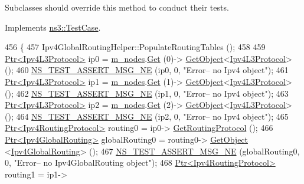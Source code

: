 Subclasses should override this method to conduct their tests. 

Implements \hyperlink{classns3_1_1TestCase_a8ff74680cf017ed42011e4be51917a24}{ns3\+::\+Test\+Case}.


\begin{DoxyCode}
456 \{
457   Ipv4GlobalRoutingHelper::PopulateRoutingTables ();
458 
459   \hyperlink{classns3_1_1Ptr}{Ptr<Ipv4L3Protocol>} ip0 = \hyperlink{classTwoLanTest_a6f71e9cc2b2a77a02f031abe9467b74c}{m\_nodes}.\hyperlink{classns3_1_1NodeContainer_a9ed96e2ecc22e0f5a3d4842eb9bf90bf}{Get} (0)->
      \hyperlink{classns3_1_1Object_a13e18c00017096c8381eb651d5bd0783}{GetObject}<\hyperlink{classns3_1_1Ipv4L3Protocol}{Ipv4L3Protocol}> ();
460   \hyperlink{group__testing_ga73d66fb0050a5111453fd144e767b91a}{NS\_TEST\_ASSERT\_MSG\_NE} (ip0, 0, \textcolor{stringliteral}{"Error-- no Ipv4 object"});  
461   \hyperlink{classns3_1_1Ptr}{Ptr<Ipv4L3Protocol>} ip1 = \hyperlink{classTwoLanTest_a6f71e9cc2b2a77a02f031abe9467b74c}{m\_nodes}.\hyperlink{classns3_1_1NodeContainer_a9ed96e2ecc22e0f5a3d4842eb9bf90bf}{Get} (1)->
      \hyperlink{classns3_1_1Object_a13e18c00017096c8381eb651d5bd0783}{GetObject}<\hyperlink{classns3_1_1Ipv4L3Protocol}{Ipv4L3Protocol}> ();
462   \hyperlink{group__testing_ga73d66fb0050a5111453fd144e767b91a}{NS\_TEST\_ASSERT\_MSG\_NE} (ip1, 0, \textcolor{stringliteral}{"Error-- no Ipv4 object"});  
463   \hyperlink{classns3_1_1Ptr}{Ptr<Ipv4L3Protocol>} ip2 = \hyperlink{classTwoLanTest_a6f71e9cc2b2a77a02f031abe9467b74c}{m\_nodes}.\hyperlink{classns3_1_1NodeContainer_a9ed96e2ecc22e0f5a3d4842eb9bf90bf}{Get} (2)->
      \hyperlink{classns3_1_1Object_a13e18c00017096c8381eb651d5bd0783}{GetObject}<\hyperlink{classns3_1_1Ipv4L3Protocol}{Ipv4L3Protocol}> ();
464   \hyperlink{group__testing_ga73d66fb0050a5111453fd144e767b91a}{NS\_TEST\_ASSERT\_MSG\_NE} (ip2, 0, \textcolor{stringliteral}{"Error-- no Ipv4 object"});  
465   \hyperlink{classns3_1_1Ptr}{Ptr<Ipv4RoutingProtocol>} routing0 = ip0->
      \hyperlink{classns3_1_1Ipv4L3Protocol_aa1e4efbf4978299e47406895c3f4b41d}{GetRoutingProtocol} ();
466   \hyperlink{classns3_1_1Ptr}{Ptr<Ipv4GlobalRouting>} globalRouting0 = routing0->
      \hyperlink{classns3_1_1Object_a13e18c00017096c8381eb651d5bd0783}{GetObject} <\hyperlink{classns3_1_1Ipv4GlobalRouting}{Ipv4GlobalRouting}> ();
467   \hyperlink{group__testing_ga73d66fb0050a5111453fd144e767b91a}{NS\_TEST\_ASSERT\_MSG\_NE} (globalRouting0, 0, \textcolor{stringliteral}{"Error-- no Ipv4GlobalRouting object"});  
468   \hyperlink{classns3_1_1Ptr}{Ptr<Ipv4RoutingProtocol>} routing1 = ip1->

\end{DoxyCode}
